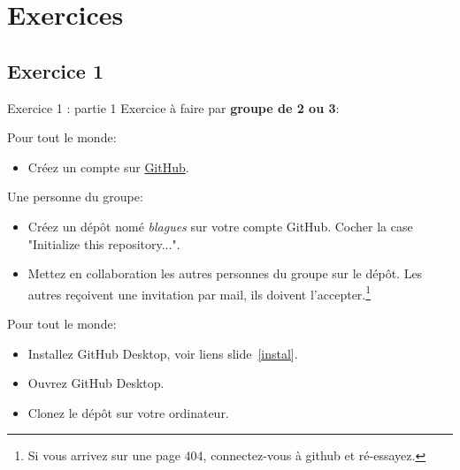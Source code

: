 \documentclass{beamer}
\begin{document}
\section{Exercices}
\subsection{Exercice 1}
\begin{frame}{Exercice 1 : partie 1}
Exercice à faire par \textbf{groupe de 2 ou 3}:

Pour tout le monde:
\begin{itemize}
    \item Créez un compte sur \href{https://github.com}{GitHub}.
\end{itemize}
Une personne du groupe:
\begin{itemize}
    \item Créez un dépôt nomé \textit{blagues} sur votre compte GitHub. Cocher la case "Initialize this repository...".
    \item Mettez en collaboration les autres personnes du groupe sur le dépôt.
        Les autres reçoivent une invitation par mail, ils doivent l'accepter.\footnote{Si vous arrivez sur une page 404, connectez-vous à github et ré-essayez.}
\end{itemize}
Pour tout le monde:
\begin{itemize}
    \item Installez GitHub Desktop, voir liens slide~\ref{instal}.
    \item Ouvrez GitHub Desktop.
    \item Clonez le dépôt sur votre ordinateur.
\end{itemize}
\end{frame}
\end{document}

